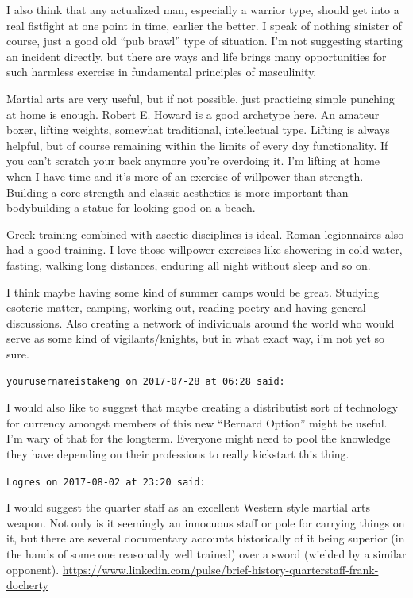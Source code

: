 \begin{footnotesize}
\begin{sffamily}
I also think that any actualized man, especially a warrior type, should get into a real fistfight at one point in time, earlier the better. I speak of nothing sinister of course, just a good old ``pub brawl'' type of situation. I'm not suggesting starting an incident directly, but there are ways and life brings many opportunities for such harmless exercise in fundamental principles of masculinity.

Martial arts are very useful, but if not possible, just practicing simple punching at home is enough. Robert E. Howard is a good archetype here. An amateur boxer, lifting weights, somewhat traditional, intellectual type. Lifting is always helpful, but of course remaining within the limits of every day functionality. If you can't scratch your back anymore you're overdoing it. I'm lifting at home when I have time and it's more of an exercise of willpower than strength. Building a core strength and classic aesthetics is more important than bodybuilding a statue for looking good on a beach.

Greek training combined with ascetic disciplines is ideal. Roman legionnaires also had a good training. I love those willpower exercises like showering in cold water, fasting, walking long distances, enduring all night without sleep and so on.

I think maybe having some kind of summer camps would be great. Studying esoteric matter, camping, working out, reading poetry and having general discussions. Also creating a network of individuals around the world who would serve as some kind of vigilants/knights, but in what exact way, i'm not yet so sure.

\hfill

\texttt{yourusernameistakeng on 2017-07-28 at 06:28 said:}

I would also like to suggest that maybe creating a distributist sort of technology for currency amongst members of this new ``Bernard Option'' might be useful. I'm wary of that for the longterm. Everyone might need to pool the knowledge they have depending on their professions to really kickstart this thing.

\hfill

\texttt{Logres on 2017-08-02 at 23:20 said:}

I would suggest the quarter staff as an excellent Western style martial arts weapon. Not only is it seemingly an innocuous staff or pole for carrying things on it, but there are several documentary accounts historically of it being superior (in the hands of some one reasonably well trained) over a sword (wielded by a similar opponent).
\url{https://www.linkedin.com/pulse/brief-history-quarterstaff-frank-docherty}


\end{sffamily}
\end{footnotesize}

